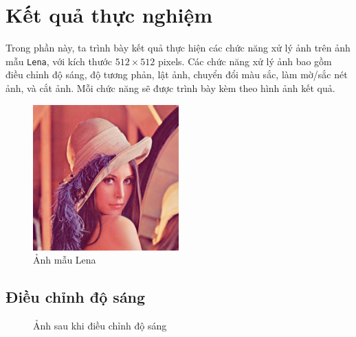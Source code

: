 \section{Kết quả thực nghiệm}

Trong phần này, ta trình bày kết quả thực hiện các chức năng xử lý ảnh trên ảnh mẫu \texttt{Lena}, với kích thước \(512 \times 512\) pixels. Các chức năng xử lý ảnh bao gồm điều chỉnh độ sáng, độ tương phản, lật ảnh, chuyển đổi màu sắc, làm mờ/sắc nét ảnh, và cắt ảnh. Mỗi chức năng sẽ được trình bày kèm theo hình ảnh kết quả.

\begin{figure}[H]
	\centering
	\includegraphics[width=0.5\textwidth]{imgs/lena.png}
	\caption{Ảnh mẫu Lena}
\end{figure}

\subsection{Điều chỉnh độ sáng}

\begin{figure}[H]
	\centering
	\hfill
	\caption{Ảnh sau khi điều chỉnh độ sáng}
\end{figure}

